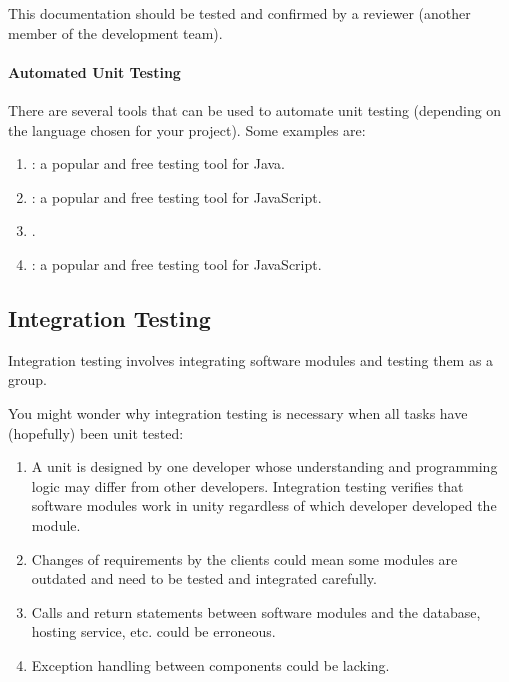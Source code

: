 \documentclass[letterpaper,10pt,english]{jupyterBook}
\begin{document}
\sphinxAtStartPar
This documentation should be tested and confirmed by a reviewer (another
member of the development team).


\paragraph{Automated Unit Testing}
\label{\detokenize{chapter_13/testing:automated-unit-testing}}
\sphinxAtStartPar
There are several tools that can be used to automate unit testing
(depending on the language chosen for your project). Some examples are:
\begin{enumerate}
%
\item {} 
\sphinxAtStartPar
{}: a popular and free
testing tool for Java.

\item {} 
\sphinxAtStartPar
{}: a popular and free testing
tool for JavaScript.

\item {} 
\sphinxAtStartPar
{}.

\item {} 
\sphinxAtStartPar
{}: a popular and free
testing tool for JavaScript.

\end{enumerate}


\subsection{Integration Testing}
\label{\detokenize{chapter_13/testing:integration-testing}}
\sphinxAtStartPar
Integration testing involves integrating software modules and testing
them as a group.

\sphinxAtStartPar
You might wonder why integration testing is necessary when all tasks
have (hopefully) been unit tested:
\begin{enumerate}
%
\item {} 
\sphinxAtStartPar
A unit is designed by one developer whose understanding and
programming logic may differ from other developers. Integration
testing verifies that software modules work in unity regardless of
which developer developed the module.

\item {} 
\sphinxAtStartPar
Changes of requirements by the clients could mean some modules are
outdated and need to be tested and integrated carefully.

\item {} 
\sphinxAtStartPar
Calls and return statements between software modules and the
database, hosting service, etc. could be erroneous.

\item {} 
\sphinxAtStartPar
Exception handling between components could be lacking.

\end{enumerate}
\end{document}
